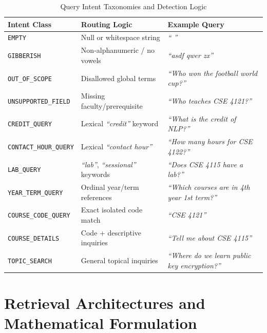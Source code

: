 \documentclass[12pt,a4paper]{report}
\begin{document}
\begin{table}[H]
    \centering
    \caption{Query Intent Taxonomies and Detection Logic}
    \label{tab:intents}
    \begin{tabularx}{\textwidth}{llX}
        \toprule
        \textbf{Intent Class} & \textbf{Routing Logic} & \textbf{Example Query} \\
        \midrule
        \texttt{EMPTY} & Null or whitespace string & \textit{`` ''} \\
        \texttt{GIBBERISH} & Non-alphanumeric / no vowels & \textit{``asdf qwer zx''} \\
        \texttt{OUT\_OF\_SCOPE} & Disallowed global terms & \textit{``Who won the football world cup?''} \\
        \texttt{UNSUPPORTED\_FIELD} & Missing faculty/prerequisite & \textit{``Who teaches CSE 4121?''} \\
        \texttt{CREDIT\_QUERY} & Lexical \textit{``credit''} keyword & \textit{``What is the credit of NLP?''} \\
        \texttt{CONTACT\_HOUR\_QUERY} & Lexical \textit{``contact hour''} & \textit{``How many hours for CSE 4122?''} \\
        \texttt{LAB\_QUERY} & \textit{``lab''}, \textit{``sessional''} keywords & \textit{``Does CSE 4115 have a lab?''} \\
        \texttt{YEAR\_TERM\_QUERY} & Ordinal year/term references & \textit{``Which courses are in 4th year 1st term?''} \\
        \texttt{COURSE\_CODE\_QUERY} & Exact isolated code match & \textit{``CSE 4121''} \\
        \texttt{COURSE\_DETAILS} & Code + descriptive inquiries & \textit{``Tell me about CSE 4115''} \\
        \texttt{TOPIC\_SEARCH} & General topical inquiries & \textit{``Where do we learn public key encryption?''} \\
        \bottomrule
    \end{tabularx}
\end{table}

\chapter{Retrieval Architectures and Mathematical Formulation}
\end{document}
